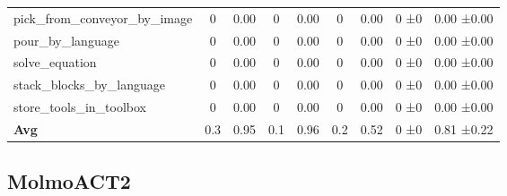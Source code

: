 \begin{table}[H]
{\begin{tabular}{l|c|c|c|c|c|c|c|c}
pick\_from\_conveyor\_by\_image & 0 & 0.00 & 0 & 0.00 & 0 & 0.00 & 0 ±0 & 0.00 ±0.00 \\
pour\_by\_language & 0 & 0.00 & 0 & 0.00 & 0 & 0.00 & 0 ±0 & 0.00 ±0.00 \\
solve\_equation & 0 & 0.00 & 0 & 0.00 & 0 & 0.00 & 0 ±0 & 0.00 ±0.00 \\
stack\_blocks\_by\_language & 0 & 0.00 & 0 & 0.00 & 0 & 0.00 & 0 ±0 & 0.00 ±0.00 \\
store\_tools\_in\_toolbox & 0 & 0.00 & 0 & 0.00 & 0 & 0.00 & 0 ±0 & 0.00 ±0.00 \\
\hline
\textbf{Avg} & 0.3 & 0.95 & 0.1 & 0.96 & 0.2 & 0.52 & 0 ±0 & 0.81 ±0.22 \\
\hline
\end{tabular}
}
\end{table}
\subsection{MolmoACT2}
\label{part:molmoact2}

